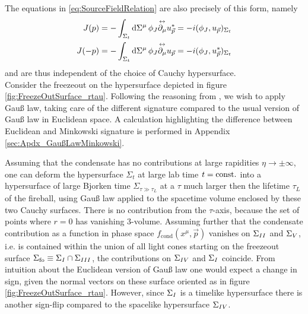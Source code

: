 The equations in \eqref{eq:SourceFieldRelation} are also precisely of this form, namely
\begin{subequations}
    \begin{align}
        J(p)&=-\int_{\Sigma_t}\text{d}\Sigma^\mu\,\phi_J\overset{\leftrightarrow}{\partial_\mu}u_{\vec{p}}^*=-{i}(\phi_J,u_{\vec{p}})_{\Sigma_t}\\
        J(-p)&=-\int_{\Sigma_t}\text{d}\Sigma^\mu\,\phi_J\overset{\leftrightarrow}{\partial_\mu}u_{\vec{p}}=-{i}(\phi_J,u_{\vec{p}}^*)_{\Sigma_t}
    \end{align}
    \label{eq:SourceFieldRelation_InnerProduct}
\end{subequations}
and are thus independent of the choice of Cauchy hypersurface.\\
Consider the freezeout on the hypersurface depicted in figure \ref{fig:FreezeOutSurface_rtau}. Following the reasoning from \cite{KirchnerEtAl_2023}, we wish to apply Gauß law, taking care of the different signature compared to the usual version of Gauß law in Euclidean space. A calculation highlighting the difference between Euclidean and Minkowski signature is performed in Appendix \ref{sec:Apdx_GaußLawMinkowski}.

Assuming that the condensate has no contributions at large rapidities ${\eta\to\pm\infty}$, one can deform the hypersurface $\Sigma_t$ at large lab time ${t={\text{const.}}}$ into a hypersurface of large Bjorken time $\Sigma_{\tau\gg\tau_L}$ at a $\tau$ much larger then the lifetime $\tau_L$ of the fireball, using Gauß law applied to the spacetime volume enclosed by these two Cauchy surfaces. There is no contribution from the $\tau$-axis, because the set of points where $r=0$ has vanishing 3-volume. Assuming further that the condensate contribution as a function in phase space $f_{\text{cond}}(x^\mu,\vec{p})$ vanishes on $\Sigma_{\rom{2}}$ and $\Sigma_{\rom{5}}$, i.e. is contained within the union of all light cones starting on the freezeout surface ${\Sigma_{\text{fo}}\equiv\Sigma_{\rom{1}}\cap\Sigma_{\rom{3}}}$, the contributions on $\Sigma_{\rom{4}}$ and $\Sigma_{\rom{1}}$ coincide. From intuition about the Euclidean version of Gauß law one would expect a change in sign, given the normal vectors on these surface oriented as in figure \ref{fig:FreezeOutSurface_rtau}. However, since $\Sigma_{\rom{1}}$ is a timelike hypersurface there is another sign-flip compared to the spacelike hypersurface $\Sigma_{\rom{4}}$.

